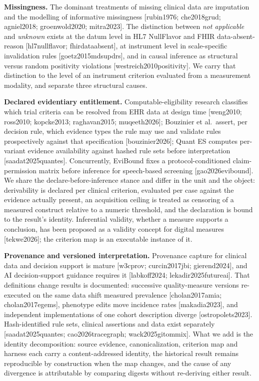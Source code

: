 \documentclass[11pt]{article}
\begin{document}
\textbf{Missingness.} The dominant treatments of missing clinical data are imputation and the modelling of informative missingness [rubin1976; che2018grud; agniel2018; groenwold2020; mitra2023]. The distinction between \emph{not applicable} and \emph{unknown} exists at the datum level in HL7 NullFlavor and FHIR data-absent-reason [hl7nullflavor; fhirdataabsent], at instrument level in scale-specific invalidation rules [goetz2015mdsupdrs], and in causal inference as structural versus random positivity violations [westreich2010positivity]. We carry that distinction to the level of an instrument criterion evaluated from a measurement modality, and separate three structural causes.

\textbf{Declared evidentiary entitlement.} Computable-eligibility research classifies which trial criteria can be resolved from EHR data at design time [weng2010; ross2010; kopcke2013; raghavan2015; muqeeth2026]; Bouzinier et al.~assert, per decision rule, which evidence types the rule may use and validate rules prospectively against that specification [bouzinier2026]; Quant ES computes per-variant evidence availability against hashed rule sets before interpretation [saadat2025quantes]. Concurrently, EviBound fixes a protocol-conditioned claim-permission matrix before inference for speech-based screening [gao2026evibound]. We share the declare-before-inference stance and differ in the unit and the object: derivability is declared per clinical criterion, evaluated per case against the evidence actually present, an acquisition ceiling is treated as censoring of a measured construct relative to a numeric threshold, and the declaration is bound to the result's identity. Inferential validity, whether a measure supports a conclusion, has been proposed as a validity concept for digital measures [tekwe2026]; the criterion map is an executable instance of it.

\textbf{Provenance and versioned interpretation.} Provenance capture for clinical data and decision support is mature [w3cprov; curcin2017jbi; gierend2024], and AI decision-support guidance requires it [labkoff2024; lekadir2025futureai]. That definitions change results is documented: successive quality-measure versions re-executed on the same data shift measured prevalence [cholan2017amia; cholan2017egems], phenotype edits move incidence rates [makadia2023], and independent implementations of one cohort description diverge [ostropolets2023]. Hash-identified rule sets, clinical assertions and data exist separately [saadat2025quantes; cao2026tracegraph; wack2025gitommix]. What we add is the identity decomposition: source evidence, canonicalization, criterion map and harness each carry a content-addressed identity, the historical result remains reproducible by construction when the map changes, and the cause of any divergence is attributable by comparing digests without re-deriving either result.
\end{document}
